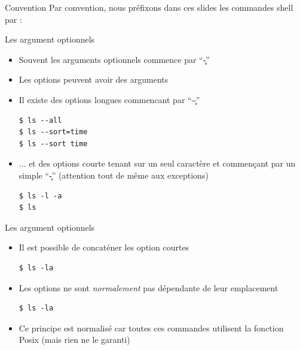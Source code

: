 \begin{frame}[fragile=singleslide]{Convention}
  Par convention,  nous préfixons dans ces slides  les commandes shell
  par :
\end{frame}

\begin{frame}[fragile=singleslide]{Les argument optionnels}
  \begin{itemize}
  \item Souvent les arguments optionnels commence par ``\c{-}''
  \item Les options peuvent avoir des arguments
  \item Il existe des options longues commencant par ``\c{--}''
    \begin{lstlisting}
$ ls --all
$ ls --sort=time
$ ls --sort time
    \end{lstlisting}
  \item  ... et des  options courte  tenant sur  un seul  caractère et
    commençant  par un  simple  ``\c{-}'' (attention  tout  de même  aux
    exceptions)
    \begin{lstlisting}
$ ls -l -a
$ ls
    \end{lstlisting}
  \end{itemize}
\end{frame}

\begin{frame}[fragile=singleslide]{Les argument optionnels}
  \begin{itemize}
  \item Il est possible de concaténer les option courtes
    \begin{lstlisting}
$ ls -la
    \end{lstlisting} %
  \item Les options ne  sont \emph{normalement} pas dépendante de leur
    emplacement
    \begin{lstlisting}
$ ls -la
    \end{lstlisting} %
  \item Ce  principe est normalisé car toutes  ces commandes utilisent
    la fonction Posix  (mais rien ne le garanti)
  \end{itemize}
\end{frame}

